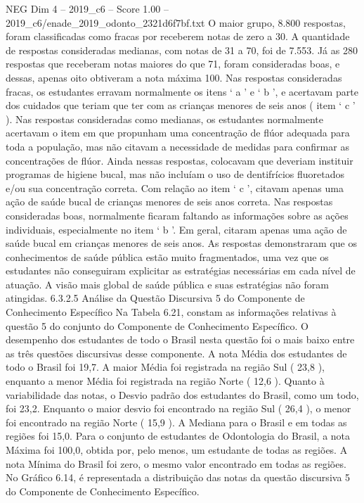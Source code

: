\begin{textsample}{NEG Dim 4 – 2019\_c6 – Score 1.00 – 2019\_c6/enade\_2019\_odonto\_2321d6f7bf.txt}
O maior grupo, 8.800 respostas, foram classificadas como fracas por receberem notas de zero a 30.
A quantidade de respostas consideradas medianas, com notas de 31 a 70, foi de 7.553.
Já as 280 respostas que receberam notas maiores do que 71, foram consideradas boas, e dessas, apenas oito obtiveram a nota máxima 100.
Nas respostas consideradas fracas, os estudantes erravam normalmente os itens ‘ a ’ e ‘ b ’, e acertavam parte dos cuidados que teriam que ter com as crianças menores de seis anos ( item ‘ c ’ ).
Nas respostas consideradas como medianas, os estudantes normalmente acertavam o item em que propunham uma concentração de flúor adequada para toda a população, mas não citavam a necessidade de medidas para confirmar as concentrações de flúor.
Ainda nessas respostas, colocavam que deveriam instituir programas de higiene bucal, mas não incluíam o uso de dentifrícios fluoretados e/ou sua concentração correta.
Com relação ao item ‘ c ’, citavam apenas uma ação de saúde bucal de crianças menores de seis anos correta.
Nas respostas consideradas boas, normalmente ficaram faltando as informações sobre as ações individuais, especialmente no item ‘ b ’.
Em geral, citaram apenas uma ação de saúde bucal em crianças menores de seis anos.
As respostas demonstraram que os conhecimentos de saúde pública estão muito fragmentados, uma vez que os estudantes não conseguiram explicitar as estratégias necessárias em cada nível de atuação.
A visão mais global de saúde pública e suas estratégias não foram atingidas. 6.3.2.5 Análise da Questão Discursiva 5 do Componente de Conhecimento Específico Na Tabela 6.21, constam as informações relativas à questão 5 do conjunto do Componente de Conhecimento Específico.
O desempenho dos estudantes de todo o Brasil nesta questão foi o mais baixo entre as três questões discursivas desse componente.
A nota Média dos estudantes de todo o Brasil foi 19,7.
A maior Média foi registrada na região Sul ( 23,8 ), enquanto a menor Média foi registrada na região Norte ( 12,6 ).
Quanto à variabilidade das notas, o Desvio padrão dos estudantes do Brasil, como um todo, foi 23,2.
Enquanto o maior desvio foi encontrado na região Sul ( 26,4 ), o menor foi encontrado na região Norte ( 15,9 ).
A Mediana para o Brasil e em todas as regiões foi 15,0.
Para o conjunto de estudantes de Odontologia do Brasil, a nota Máxima foi 100,0, obtida por, pelo menos, um estudante de todas as regiões.
A nota Mínima do Brasil foi zero, o mesmo valor encontrado em todas as regiões.
No Gráfico 6.14, é representada a distribuição das notas da questão discursiva 5 do Componente de Conhecimento Específico.

\end{textsample}
